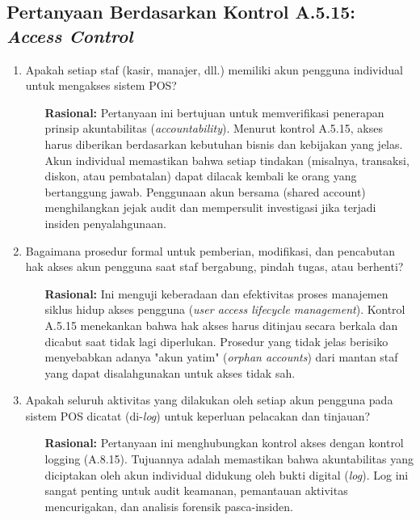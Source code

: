 \documentclass[12pt, a4paper]{report}
\begin{document}
\subsection{Pertanyaan Berdasarkan Kontrol A.5.15: \textit{Access Control}}
\begin{enumerate}
    \item Apakah setiap staf (kasir, manajer, dll.) memiliki akun pengguna individual untuk mengakses sistem POS?
    \begin{itemize}
        \item[\textbf{Rasional:}] Pertanyaan ini bertujuan untuk memverifikasi penerapan prinsip akuntabilitas (\textit{accountability}). Menurut kontrol A.5.15, akses harus diberikan berdasarkan kebutuhan bisnis dan kebijakan yang jelas. Akun individual memastikan bahwa setiap tindakan (misalnya, transaksi, diskon, atau pembatalan) dapat dilacak kembali ke orang yang bertanggung jawab. Penggunaan akun bersama (shared account) menghilangkan jejak audit dan mempersulit investigasi jika terjadi insiden penyalahgunaan.
    \end{itemize}

    \item Bagaimana prosedur formal untuk pemberian, modifikasi, dan pencabutan hak akses akun pengguna saat staf bergabung, pindah tugas, atau berhenti?
    \begin{itemize}
        \item[\textbf{Rasional:}] Ini menguji keberadaan dan efektivitas proses manajemen siklus hidup akses pengguna (\textit{user access lifecycle management}). Kontrol A.5.15 menekankan bahwa hak akses harus ditinjau secara berkala dan dicabut saat tidak lagi diperlukan. Prosedur yang tidak jelas berisiko menyebabkan adanya "akun yatim" (\textit{orphan accounts}) dari mantan staf yang dapat disalahgunakan untuk akses tidak sah.
    \end{itemize}
    
    \item Apakah seluruh aktivitas yang dilakukan oleh setiap akun pengguna pada sistem POS dicatat (di-\textit{log}) untuk keperluan pelacakan dan tinjauan? \citep{widodo2022keamanan}
    \begin{itemize}
        \item[\textbf{Rasional:}] Pertanyaan ini menghubungkan kontrol akses dengan kontrol logging (A.8.15). Tujuannya adalah memastikan bahwa akuntabilitas yang diciptakan oleh akun individual didukung oleh bukti digital (\textit{log}). Log ini sangat penting untuk audit keamanan, pemantauan aktivitas mencurigakan, dan analisis forensik pasca-insiden.
    \end{itemize}
\end{enumerate}
\end{document}

